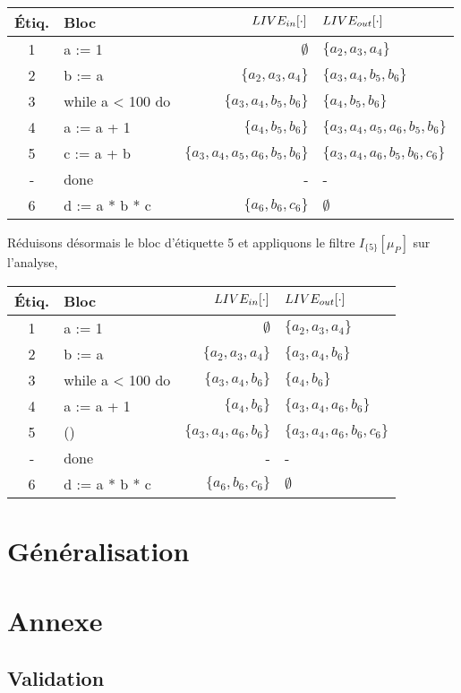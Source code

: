 \documentclass[a4paper, 12pt]{article}
\begin{document}
\begin{center}
	\begin{tabular}{||c|l|r|l||}
	\hline
	Étiq. & Bloc & $LIVE_{in}[\cdot]$ & $LIVE_{out}[\cdot]$ \\
	\hline
	1 & a := 1 & $\emptyset$ & $\{a_2, a_3, a_4\}$\\
	2 & b := a & $\{a_2, a_3, a_4\}$ & $\{a_3, a_4, b_5, b_6\}$\\
	3 & while a < 100 do & $\{a_3, a_4, b_5, b_6\}$ & $\{a_4, b_5, b_6\}$\\
	4 & a := a + 1 & $\{a_4, b_5, b_6\}$ & $\{a_3, a_4, a_5, a_6, b_5, b_6\}$\\
	5 & c := a + b & $\{a_3, a_4, a_5, a_6, b_5, b_6\}$ & $\{a_3, a_4, a_6, b_5, b_6, c_6\}$\\
	- & done & - & -\\
	6 & d := a * b * c & $\{a_6, b_6, c_6\}$ & $\emptyset$\\
	\hline
	\end{tabular}
\end{center}
Réduisons désormais le bloc d'étiquette 5 et appliquons le filtre $I_{\{5\}}[\mu_P]$ sur l'analyse,
\begin{center}
	\begin{tabular}{||c|l|r|l||}
	\hline
	Étiq. & Bloc & $LIVE_{in}[\cdot]$ & $LIVE_{out}[\cdot]$ \\
	\hline
	1 & a := 1 & $\emptyset$ & $\{a_2, a_3, a_4\}$\\
	2 & b := a & $\{a_2, a_3, a_4\}$ & $\{a_3, a_4, b_6\}$\\
	3 & while a < 100 do & $\{a_3, a_4, b_6\}$ & $\{a_4, b_6\}$\\
	4 & a := a + 1 & $\{a_4, b_6\}$ & $\{a_3, a_4, a_6, b_6\}$\\
	5 & () & $\{a_3, a_4, a_6, b_6\}$ & $\{a_3, a_4, a_6, b_6, c_6\}$\\
	- & done & - & -\\
	6 & d := a * b * c & $\{a_6, b_6, c_6\}$ & $\emptyset$\\
	\hline
	\end{tabular}
\end{center}
\section{Généralisation}
\section{Annexe}
\subsection{Validation}
\end{document}
